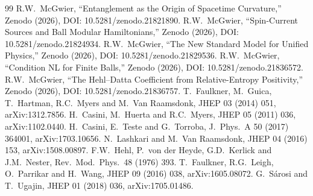 \documentclass[11pt]{article}
\begin{document}
\begin{thebibliography}{99}
 R.W.\ McGwier, ``Entanglement as the Origin of Spacetime Curvature,'' Zenodo (2026), DOI: 10.5281/zenodo.21821890.
 R.W.\ McGwier, ``Spin-Current Sources and Ball Modular Hamiltonians,'' Zenodo (2026), DOI: 10.5281/zenodo.21824934.
 R.W.\ McGwier, ``The New Standard Model for Unified Physics,'' Zenodo (2026), DOI: 10.5281/zenodo.21829536.
 R.W.\ McGwier, ``Condition NL for Finite Balls,'' Zenodo (2026), DOI: 10.5281/zenodo.21836572.
 R.W.\ McGwier, ``The Hehl--Datta Coefficient from Relative-Entropy Positivity,'' Zenodo (2026), DOI: 10.5281/zenodo.21836757.
 T.\ Faulkner, M.\ Guica, T.\ Hartman, R.C.\ Myers and M.\ Van Raamsdonk, JHEP 03 (2014) 051, arXiv:1312.7856.
 H.\ Casini, M.\ Huerta and R.C.\ Myers, JHEP 05 (2011) 036, arXiv:1102.0440.
 H.\ Casini, E.\ Teste and G.\ Torroba, J.\ Phys.\ A 50 (2017) 364001, arXiv:1703.10656.
 N.\ Lashkari and M.\ Van Raamsdonk, JHEP 04 (2016) 153, arXiv:1508.00897.
 F.W.\ Hehl, P.\ von der Heyde, G.D.\ Kerlick and J.M.\ Nester, Rev.\ Mod.\ Phys.\ 48 (1976) 393.
 T.\ Faulkner, R.G.\ Leigh, O.\ Parrikar and H.\ Wang, JHEP 09 (2016) 038, arXiv:1605.08072.
 G.\ S\'arosi and T.\ Ugajin, JHEP 01 (2018) 036, arXiv:1705.01486.
\end{thebibliography}
\end{document}
